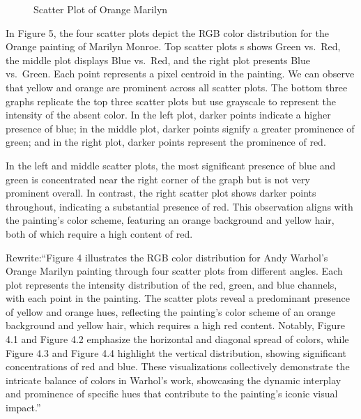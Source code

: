 \documentclass{article}
\begin{document}
\begin{figure}[ht]
  \caption{Scatter Plot of Orange Marilyn}
  \label{fig:orange_marilyn_scatter}
\end{figure}

In Figure 5, the four scatter plots depict the RGB color distribution
for the Orange painting of Marilyn Monroe. Top scatter plots s shows
Green vs.~Red, the middle plot displays Blue vs.~Red, and the right plot
presents Blue vs.~Green. Each point represents a pixel centroid in the
painting. We can observe that yellow and orange are prominent across all
scatter plots. The bottom three graphs replicate the top three scatter
plots but use grayscale to represent the intensity of the absent color.
In the left plot, darker points indicate a higher presence of blue; in
the middle plot, darker points signify a greater prominence of green;
and in the right plot, darker points represent the prominence of red.

In the left and middle scatter plots, the most significant presence of
blue and green is concentrated near the right corner of the graph but is
not very prominent overall. In contrast, the right scatter plot shows
darker points throughout, indicating a substantial presence of red. This
observation aligns with the painting's color scheme, featuring an orange
background and yellow hair, both of which require a high content of red.

Rewrite:``Figure 4 illustrates the RGB color distribution for Andy
Warhol's Orange Marilyn painting through four scatter plots from
different angles. Each plot represents the intensity distribution of the
red, green, and blue channels, with each point in the painting. The
scatter plots reveal a predominant presence of yellow and orange hues,
reflecting the painting's color scheme of an orange background and
yellow hair, which requires a high red content. Notably, Figure 4.1 and
Figure 4.2 emphasize the horizontal and diagonal spread of colors, while
Figure 4.3 and Figure 4.4 highlight the vertical distribution, showing
significant concentrations of red and blue. These visualizations
collectively demonstrate the intricate balance of colors in Warhol's
work, showcasing the dynamic interplay and prominence of specific hues
that contribute to the painting's iconic visual impact.''
\end{document}
